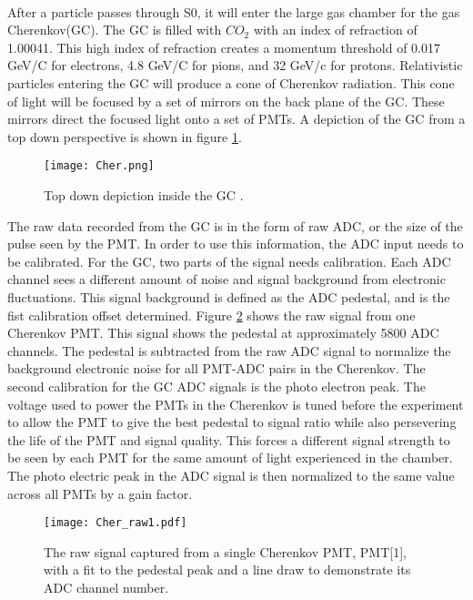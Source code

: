 	\paragraph{}After a particle passes through S0, it will enter the large gas chamber for the gas Cherenkov(GC). The GC is filled with $CO_2$ with an index of refraction of 1.00041. This high index of refraction creates a momentum threshold of 0.017 GeV/C for electrons, 4.8 GeV/C for pions, and 32 GeV/c for protons\cite{GasC}. Relativistic particles entering the GC will produce a cone of Cherenkov radiation. This cone of light will be focused by a set of mirrors on the back plane of the GC. These mirrors direct the focused light onto a set of PMTs. A depiction of the GC from a top down perspective is shown in figure \ref{fig:cer_TD}. 
	\begin{figure}[t]
		\centering
		\texttt{[image: Cher.png]}
		\caption{Top down depiction inside the GC \cite{GasC}.}
		\label{fig:cer_TD}
	\end{figure}
	The raw data recorded from the GC is in the form of raw ADC, or the size of the pulse seen by the PMT. In order to use this information, the ADC input needs to be calibrated. For the GC, two parts of the signal needs calibration. Each ADC channel sees a different amount of noise and signal background from electronic fluctuations. This signal background is defined as the ADC pedestal, and is the fist calibration offset determined. Figure \ref{fig:cer_raw} shows the raw signal from one Cherenkov PMT. This signal shows the pedestal at approximately 5800 ADC channels. The pedestal is subtracted from the raw ADC signal to normalize the background electronic noise for all PMT-ADC pairs in the Cherenkov. The second calibration for the GC ADC signals is the photo electron peak. The voltage used to power the PMTs in the Cherenkov is tuned before the experiment to allow the PMT to give the best pedestal to signal ratio while also persevering the life of the PMT and signal quality. This forces a different signal strength to be seen by each PMT for the same amount of light experienced in the chamber. The photo electric peak in the ADC signal is then normalized to the same value across all PMTs by a gain factor. 
	\begin{figure}[t]
		\centering
		\texttt{[image: Cher\_raw1.pdf]}
		\caption{The raw signal captured from a single Cherenkov PMT, PMT[1], with a fit to the pedestal peak and a line draw to demonstrate its ADC channel number.}
		\label{fig:cer_raw}
	\end{figure}

